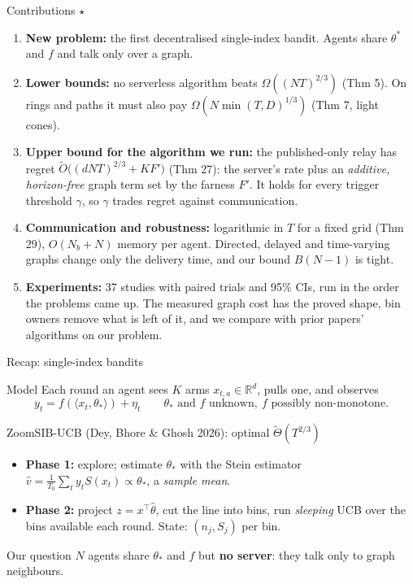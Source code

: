 \documentclass[11pt]{beamer}
\begin{document}
\begin{frame}{Contributions $\star$}
\small
\begin{enumerate}
\setlength{\itemsep}{0.35em}
\item \textbf{New problem:} the first decentralised single-index bandit. Agents share $\theta^*$ and $f$ and talk only over a graph.
\item \textbf{Lower bounds:} no serverless algorithm beats $\Omega((NT)^{2/3})$ (Thm 5). On rings and paths it must also pay $\Omega(N\min(T,D)^{1/3})$ (Thm 7, light cones).
\item \textbf{Upper bound for the algorithm we run:} the published-only relay has regret $\tilde O\big((dNT)^{2/3}+KF'\big)$ (Thm 27): the server's rate plus an \emph{additive, horizon-free} graph term set by the farness $F'$. It holds for every trigger threshold $\gamma$, so $\gamma$ trades regret against communication.
\item \textbf{Communication and robustness:} logarithmic in $T$ for a fixed grid (Thm 29), $O(N_b+N)$ memory per agent. Directed, delayed and time-varying graphs change only the delivery time, and our bound $B(N-1)$ is tight.
\item \textbf{Experiments:} 37 studies with paired trials and 95\% CIs, run in the order the problems came up. The measured graph cost has the proved shape, bin owners remove what is left of it, and we compare with prior papers' algorithms on our problem.
\end{enumerate}
\end{frame}

\begin{frame}{Recap: single-index bandits}
\small
\begin{block}{Model}
Each round an agent sees $K$ arms $x_{t,a}\in\mathbb{R}^d$, pulls one, and observes
\[
\boxed{y_t=f(\langle x_t,\theta_*\rangle)+\eta_t}\qquad\theta_*\text{ and }f\text{ unknown},\ f\text{ possibly non-monotone.}
\]
\end{block}
\begin{block}{ZoomSIB-UCB (Dey, Bhore \& Ghosh 2026): optimal $\tilde\Theta(T^{2/3})$}
\begin{itemize}
\item \textbf{Phase 1:} explore; estimate $\theta_*$ with the Stein estimator $\hat v=\frac1{T_0}\sum_t y_tS(x_t)\propto\theta_*$, a \emph{sample mean}.
\item \textbf{Phase 2:} project $z=x^\top\hat\theta$, cut the line into bins, run \emph{sleeping} UCB over the bins available each round. State: $(n_j,S_j)$ per bin.
\end{itemize}
\end{block}
\begin{alertblock}{Our question}
\centering $N$ agents share $\theta_*$ and $f$ but \textbf{no server}: they talk only to graph neighbours.
\end{alertblock}
\end{frame}
\end{document}
